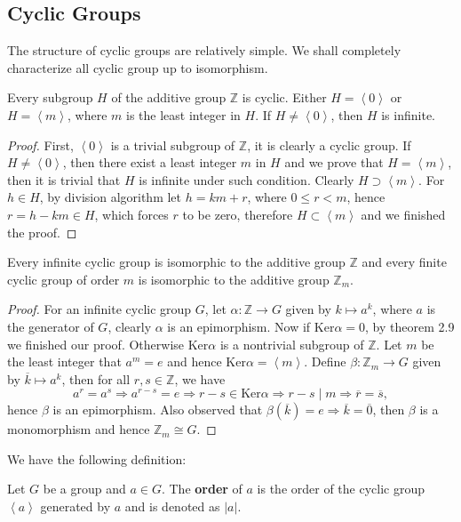 \subsection{Cyclic Groups}
The structure of cyclic groups are relatively simple. We shall completely characterize all cyclic group up to isomorphism.\par
\begin{theorem}
Every subgroup $H$ of the additive group $\mathbb{Z}$ is cyclic. Either $H=\left<0\right>$ or $H=\left<m\right>$, where $m$ is the least integer in $H$. If $H\ne\left<0\right>$, then $H$ is infinite. 
\end{theorem}
\begin{proof}
First, $\left<0\right>$ is a trivial subgroup of $\mathbb{Z}$, it is clearly a cyclic group. If $H\ne\left<0\right>$, then there exist a least integer $m$ in $H$ and we prove that $H=\left<m\right>$, then it is trivial that $H$ is infinite under such condition. Clearly $H\supset\left<m\right>$. For $h\in H$, by division algorithm let $h=km+r$, where $0\le r<m$, hence $r=h-km\in H$, which forces $r$ to be zero, therefore $H\subset\left<m\right>$ and we finished the proof.
\end{proof}
\begin{theorem}
Every infinite cyclic group is isomorphic to the additive group $\mathbb{Z}$ and every finite cyclic group of order $m$ is isomorphic to the additive group $\mathbb{Z}_m$.
\end{theorem}
\begin{proof}
For an infinite cyclic group $G$, let $\alpha:\mathbb{Z}\to G$ given by $k\mapsto a^k$, where $a$ is the generator of $G$, clearly $\alpha$ is an epimorphism. Now if $\mathrm{Ker}\alpha=0$, by theorem 2.9 we finished our proof. Otherwise $\mathrm{Ker}\alpha$ is a nontrivial subgroup of $\mathbb{Z}$. Let $m$ be the least integer that $a^m=e$ and hence $\mathrm{Ker}\alpha=\left<m\right>$. Define $\beta:\mathbb{Z}_m\to G$ given by $\overline{k}\mapsto a^k$, then for all $r,s\in\mathbb{Z}$, we have
$$
a^r=a^s\Rightarrow a^{r-s}=e\Rightarrow r-s\in \mathrm{Ker}\alpha \Rightarrow r-s\mid m\Rightarrow \overline{r}=\overline{s},
$$
hence $\beta$ is an epimorphism. Also observed that $\beta(\overline{k})=e\Rightarrow\overline{k}=\overline{0}$, then $\beta$ is a monomorphism and hence $\mathbb{Z}_m\cong G$.
\end{proof}
We have the following definition:
\begin{definition}
Let $G$ be a group and $a\in G$. The \textbf{order} of $a$ is the order of the cyclic group $\left<a\right>$ generated by $a$ and is denoted as $|a|$.
\end{definition}
